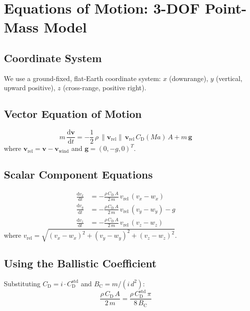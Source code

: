 \documentclass[11pt,twoside,openright]{report}
\newcommand{\dd}{\mathrm{d}}
\newcommand{\Cd}{C_{\mathrm{D}}}
\newcommand{\Bc}{B_{\mathrm{C}}}
\newcommand{\vvec}{\bm{v}}
\newcommand{\gvec}{\bm{g}}
\newcommand{\Mach}{\mathit{Ma}}
\begin{document}
\section{Equations of Motion: 3-DOF Point-Mass Model}
\label{sec:3dof}

\subsection{Coordinate System}

We use a ground-fixed, flat-Earth coordinate system: $x$ (downrange), $y$ (vertical, upward positive), $z$ (cross-range, positive right).

\subsection{Vector Equation of Motion}

\begin{equation}
  \boxed{m\,\frac{\dd \vvec}{\dd t} = -\frac{1}{2}\,\rho\,\|\vvec_{\mathrm{rel}}\|\,\vvec_{\mathrm{rel}}\,\Cd(\Mach)\,A + m\,\gvec}
  \label{eq:3dof_vector}
\end{equation}
where $\vvec_{\mathrm{rel}} = \vvec - \vvec_{\mathrm{wind}}$ and $\gvec = (0, -g, 0)^T$.

\subsection{Scalar Component Equations}

\begin{align}
  \frac{\dd v_x}{\dd t} &= -\frac{\rho\,\Cd\,A}{2\,m}\,v_{\mathrm{rel}}\,(v_x - w_x) \label{eq:3dof_x}\\
  \frac{\dd v_y}{\dd t} &= -\frac{\rho\,\Cd\,A}{2\,m}\,v_{\mathrm{rel}}\,(v_y - w_y) - g \label{eq:3dof_y}\\
  \frac{\dd v_z}{\dd t} &= -\frac{\rho\,\Cd\,A}{2\,m}\,v_{\mathrm{rel}}\,(v_z - w_z) \label{eq:3dof_z}
\end{align}
where $v_{\mathrm{rel}} = \sqrt{(v_x-w_x)^2 + (v_y-w_y)^2 + (v_z-w_z)^2}$.

\subsection{Using the Ballistic Coefficient}

Substituting $\Cd = i \cdot \Cd^{\mathrm{std}}$ and $\Bc = m/(i\,d^2)$:
\begin{equation}
  \frac{\rho\,\Cd\,A}{2\,m} = \frac{\rho\,\Cd^{\mathrm{std}}\,\pi}{8\,\Bc}
  \label{eq:drag_with_bc}
\end{equation}
\end{document}
